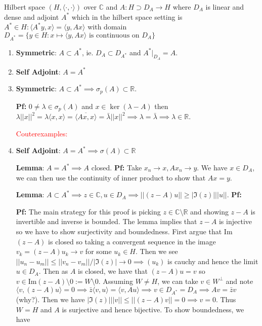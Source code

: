 \documentclass{article}
\begin{document}
Hilbert space \((H, \langle\cdot, \cdot\rangle) \) over \(\mathbb{C}\) and \(A: H\supset D_A \to H\) where \(D_A\) is linear and dense and adjoint \(A^*\) which in the hilbert space setting is \(A^* \in H: \langle A^*y, x\rangle = \langle y, Ax\rangle \) with domain \(D_{A^*} = \{y \in H:x \mapsto \langle y, Ax\rangle \text{ is continuous on } D_A\}\)

\begin{enumerate}
    \item \textbf{Symmetric}: \(A \subset A^*\), ie. \(D_A \subset D_{A^*}\) and \(A^*|_{D_{A}} = A\).
    \item \textbf{Self Adjoint}: \(A = A^*\)
    \item \textbf{Symmetric}: \(A \subset A^* \implies \sigma_p(A) \subset \mathbb{R}\).

    \textbf{Pf:} \(0 \neq \lambda \in \sigma_p(A)\) and \(x \in \ker(\lambda - A)\) then \(\lambda ||x||^2 = \lambda\langle x, x\rangle = \overline{\langle Ax, x\rangle} = \bar \lambda ||x||^2 \implies \lambda = \bar \lambda \implies \lambda \in \mathbb{R}\).


    \textcolor{red}{Couterexamples:}
    \item \textbf{Self Adjoint}: \(A = A^* \implies \sigma(A) \subset \mathbb{R}\)

    \textbf{Lemma}: \(A = A^* \implies A\) closed. \textbf{Pf:} Take \(x_n \to x, Ax_n \to y\). We have \(x \in D_A\), we can then use the continuity of inner product to show that \(Ax = y\).

    \textbf{Lemma}: \(A \subset A^* \implies z \in \mathbb{C}, u \in D_A \implies ||(z-A)u|| \geq |\Im(z)|||u||\). \textbf{Pf:} \(\)

    \textbf{Pf:} The main strategy for this proof is picking \(z \in \mathbb{C}\setminus\mathbb{R}\) and showing \(z -A \) is invertible and inverse is bounded. The lemma implies that \(z - A\) is injective so we have to show surjectivity and boundedness. First argue that Im\((z -A)\) is closed so taking a convergent sequence in the image \(v_k = (z-A)u_k \to v\) for some \(u_k \in H\). Then we see \(||u_n - u_m|| \leq ||v_n -v_m||/|\Im(z)| \to 0 \implies (u_k)\)  is cauchy and hence the limit \(u \in D_A\). Then as \(A\) is closed, we have that \((z-A)u = v\) so \(v \in \text{Im}(z-A)\setminus{0}:=W\setminus{0}\). Assuming \(W \neq H\), we can take \(v \in W^\perp\) and note \(\langle v, (z - A)u\rangle = 0 \implies \bar z\langle v, u \rangle = \langle v, Au\rangle \implies v \in D_{A^*} = D_A \implies Av = \bar z v\) (why?). Then we have \(|\Im(z)|||v|| \leq ||(z - A)v|| = 0 \implies v = 0\). Thus \(W = H\) and \(A\) is surjective and hence bijective. To show boundedness, we have


\end{enumerate}
\end{document}
